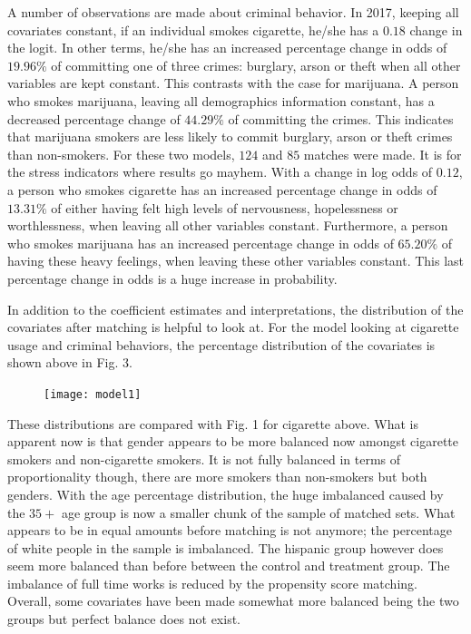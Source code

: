 \documentclass[a4paper, 10pt, conference]{ieeeconf}
\begin{document}
A number of observations are made about criminal behavior. In 2017, keeping all covariates constant, if an individual smokes cigarette, he/she has a $0.18$ change in the logit. In other terms, he/she has an increased percentage change in odds of $19.96\%$ of committing one of three crimes: burglary, arson or theft when all other variables are kept constant. This contrasts with the case for marijuana. A person who smokes marijuana, leaving all demographics information constant, has a decreased percentage change of $44.29\%$ of committing the crimes. This indicates that marijuana smokers are less likely to commit burglary, arson or theft crimes than non-smokers. For these two models, $124$ and $85$ matches were made. It is for the stress indicators where results go mayhem. With a change in log odds of $0.12$, a person who smokes cigarette has an increased percentage change in odds of $13.31\%$ of either having felt high levels of nervousness, hopelessness or worthlessness, when leaving all other variables constant. Furthermore, a person who smokes marijuana has an increased percentage change in odds of $65.20\%$ of having these heavy feelings, when leaving these other variables constant. This last percentage change in odds is a huge increase in probability. 

In addition to the coefficient estimates and interpretations, the distribution of the covariates after matching is helpful to look at. For the model looking at cigarette usage and criminal behaviors, the percentage distribution of the covariates is shown above in Fig. 3. 
\begin{figure}[t!] \texttt{[image: model1]}  \end{figure}
These distributions are compared with Fig. 1 for cigarette above. What is apparent now is that gender appears to be more balanced now amongst cigarette smokers and non-cigarette smokers. It is not fully balanced in terms of proportionality though, there are more smokers than non-smokers but both genders. With the age percentage distribution, the huge imbalanced caused by the $35+$ age group is now a smaller chunk of the sample of matched sets. What appears to be in equal amounts before matching is not anymore; the percentage of white people in the sample is imbalanced. The hispanic group however does seem more balanced than before between the control and treatment group. The imbalance of full time works is reduced by the propensity score matching. Overall, some covariates have been made somewhat more balanced being the two groups but perfect balance does not exist. 
\end{document}
